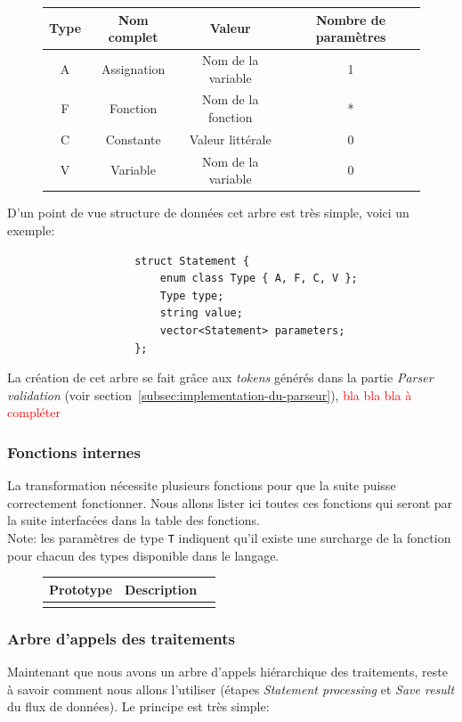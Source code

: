 \documentclass[french]{article}
\begin{document}
			\begin{figure}[H]
				\centering
				\begin{tabular}{cccc}
					Type & Nom complet & Valeur & Nombre de paramètres\\
					\hline
					A & Assignation & Nom de la variable & 1\\
					F & Fonction & Nom de la fonction & *\\
					C & Constante & Valeur littérale & 0\\
					V & Variable & Nom de la variable & 0\\
				\end{tabular}
			\end{figure}
			
			D'un point de vue structure de données cet arbre est très simple, voici un exemple:
			
			\begin{lstlisting}
					struct Statement {
						enum class Type { A, F, C, V };
						Type type;
						string value;
						vector<Statement> parameters;
					};
			\end{lstlisting}
			
			La création de cet arbre se fait grâce aux \textit{tokens} générés dans la partie \textit{Parser validation} (voir section~\ref{subsec:implementation-du-parseur}), \textcolor{red}{bla bla bla à compléter}
			
			\subsubsection{Fonctions internes}
				La transformation nécessite plusieurs fonctions pour que la suite puisse correctement fonctionner. Nous allons lister ici toutes ces fonctions qui seront par la suite interfacées dans la table des fonctions.\\
				
				Note: les paramètres de type \texttt{T} indiquent qu'il existe une surcharge de la fonction pour chacun des types disponible dans le langage.
				
				\begin{figure}[H]
					\centering
					\begin{tabular}{lll}
						Prototype & Description\\
						\hline
						\texttt{} & \\
					\end{tabular}
				\end{figure}
			
			\subsubsection{Arbre d'appels des traitements}
				\label{subsubsec:arbre-d-appels-des-traitements}
				Maintenant que nous avons un arbre d'appels hiérarchique des traitements, reste à savoir comment nous allons l'utiliser (étapes \textit{Statement processing} et \textit{Save result} du flux de données). Le principe est très simple: 
				
\end{document}
